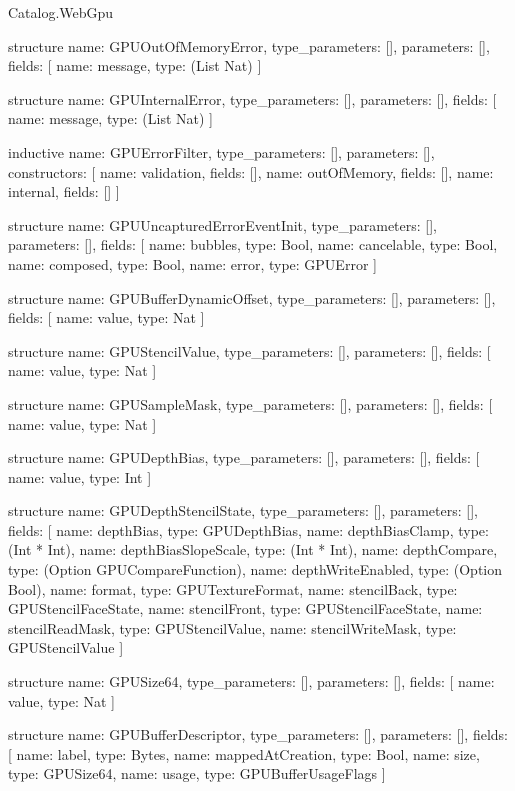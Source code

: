\begin{lexlean}{Catalog.WebGpu}
\begin{semanticmodule}
structure{
  name: GPUOutOfMemoryError,
  type_parameters: [],
  parameters: [],
  fields: [
    {name: message, type: (List Nat)}
  ]
}

structure{
  name: GPUInternalError,
  type_parameters: [],
  parameters: [],
  fields: [
    {name: message, type: (List Nat)}
  ]
}

inductive{
  name: GPUErrorFilter,
  type_parameters: [],
  parameters: [],
  constructors: [
    {name: validation, fields: []},
    {name: outOfMemory, fields: []},
    {name: internal, fields: []}
  ]
}

structure{
  name: GPUUncapturedErrorEventInit,
  type_parameters: [],
  parameters: [],
  fields: [
    {name: bubbles, type: Bool},
    {name: cancelable, type: Bool},
    {name: composed, type: Bool},
    {name: error, type: GPUError}
  ]
}

structure{
  name: GPUBufferDynamicOffset,
  type_parameters: [],
  parameters: [],
  fields: [
    {name: value, type: Nat}
  ]
}

structure{
  name: GPUStencilValue,
  type_parameters: [],
  parameters: [],
  fields: [
    {name: value, type: Nat}
  ]
}

structure{
  name: GPUSampleMask,
  type_parameters: [],
  parameters: [],
  fields: [
    {name: value, type: Nat}
  ]
}

structure{
  name: GPUDepthBias,
  type_parameters: [],
  parameters: [],
  fields: [
    {name: value, type: Int}
  ]
}

structure{
  name: GPUDepthStencilState,
  type_parameters: [],
  parameters: [],
  fields: [
    {name: depthBias, type: GPUDepthBias},
    {name: depthBiasClamp, type: (Int * Int)},
    {name: depthBiasSlopeScale, type: (Int * Int)},
    {name: depthCompare, type: (Option GPUCompareFunction)},
    {name: depthWriteEnabled, type: (Option Bool)},
    {name: format, type: GPUTextureFormat},
    {name: stencilBack, type: GPUStencilFaceState},
    {name: stencilFront, type: GPUStencilFaceState},
    {name: stencilReadMask, type: GPUStencilValue},
    {name: stencilWriteMask, type: GPUStencilValue}
  ]
}

structure{
  name: GPUSize64,
  type_parameters: [],
  parameters: [],
  fields: [
    {name: value, type: Nat}
  ]
}

structure{
  name: GPUBufferDescriptor,
  type_parameters: [],
  parameters: [],
  fields: [
    {name: label, type: Bytes},
    {name: mappedAtCreation, type: Bool},
    {name: size, type: GPUSize64},
    {name: usage, type: GPUBufferUsageFlags}
  ]
}


\end{semanticmodule}
\end{lexlean}
